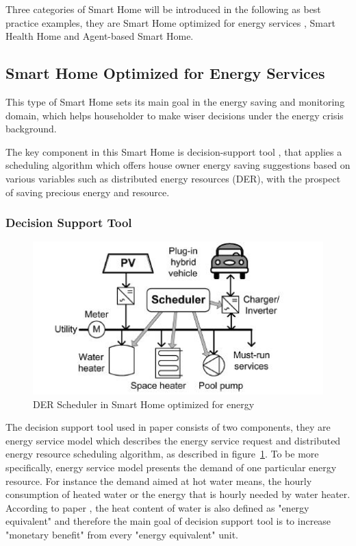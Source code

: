 Three categories of Smart Home will be introduced in the following as best practice examples, they are Smart Home optimized for energy services , Smart Health Home and Agent-based Smart Home.
 
\subsection{Smart Home Optimized for Energy Services}
This type of Smart Home sets its main goal in the energy saving and monitoring domain, which helps householder to make wiser decisions under the energy crisis background. 

The key component in this Smart Home is decision-support tool \cite{smart_home_for_energy}, that applies a scheduling algorithm which offers house owner energy saving suggestions based on various variables such as distributed energy resources (DER), with the prospect of saving precious energy and resource.

\subsubsection{Decision Support Tool}

 \begin{figure}[!htbp]
	\centering
	\includegraphics[width=1.0\textwidth]{scheduler.jpg}
		\caption{DER Scheduler in Smart Home optimized for energy\cite{smart_home_for_energy}}
	\label{fig:smart-home-scheduler}
\end{figure}

The decision support tool used in paper \cite{smart_home_for_energy} consists of two components, they are energy service model which describes the energy service request and distributed energy resource scheduling algorithm, as described in figure~\ref{fig:smart-home-scheduler}. To be more specifically, energy service model presents the demand of one particular energy resource. For instance the demand aimed at hot water means, the hourly consumption of heated water or the energy that is hourly needed by water heater.  According to paper \cite{smart_home_for_energy}, the heat content of water is also defined as "energy equivalent" and therefore the main goal of decision support tool is to increase "monetary benefit"  from every "energy equivalent" unit.

